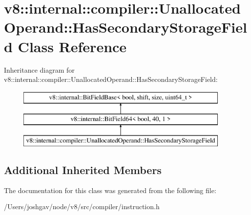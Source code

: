 \hypertarget{classv8_1_1internal_1_1compiler_1_1_unallocated_operand_1_1_has_secondary_storage_field}{}\section{v8\+:\+:internal\+:\+:compiler\+:\+:Unallocated\+Operand\+:\+:Has\+Secondary\+Storage\+Field Class Reference}
\label{classv8_1_1internal_1_1compiler_1_1_unallocated_operand_1_1_has_secondary_storage_field}
Inheritance diagram for v8\+:\+:internal\+:\+:compiler\+:\+:Unallocated\+Operand\+:\+:Has\+Secondary\+Storage\+Field\+:\begin{figure}[H]
\begin{center}
\leavevmode
\includegraphics[height=3.000000cm]{classv8_1_1internal_1_1compiler_1_1_unallocated_operand_1_1_has_secondary_storage_field}
\end{center}
\end{figure}
\subsection*{Additional Inherited Members}


The documentation for this class was generated from the following file\+:\begin{DoxyCompactItemize}
\item 
/\+Users/joshgav/node/v8/src/compiler/instruction.\+h\end{DoxyCompactItemize}
